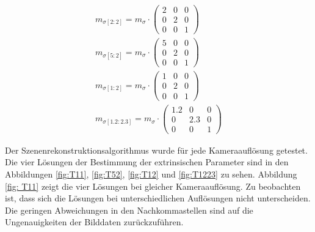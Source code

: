 \begin{gather}
	m_{\sigma[2:2]}=
	m_\sigma \cdot
	\begin{pmatrix}
2&0&0\\
0&2&0\\
0&0&1	
	\end{pmatrix}\\
	m_{\sigma[5:2]}=
m_\sigma \cdot
\begin{pmatrix}
	5&0&0\\
	0&2&0\\
	0&0&1	
\end{pmatrix}\\
	m_{\sigma[1:2]}=
m_\sigma \cdot
\begin{pmatrix}
	1&0&0\\
	0&2&0\\
	0&0&1	
\end{pmatrix}\\
	m_{\sigma[1.2:2.3]}=
m_\sigma \cdot
\begin{pmatrix}
	1.2&0&0\\
	0&2.3&0\\
	0&0&1	
\end{pmatrix}
\end{gather}


Der Szenenrekonstruktionsalgorithmus wurde für jede Kameraauflösung getestet. Die vier Lösungen der Bestimmung der extrinsischen Parameter sind in den Abbildungen \ref{fig:T11}, \ref{fig:T52}, \ref{fig:T12} und \ref{fig:T1223} zu sehen. Abbildung \ref{fig: T11} zeigt die vier Lösungen bei gleicher Kameraauflösung. Zu beobachten ist, dass sich die Lösungen bei unterschiedlichen Auflösungen nicht unterscheiden. Die geringen Abweichungen in den Nachkommastellen sind auf die Ungenauigkeiten der Bilddaten zurückzuführen.

%
%




